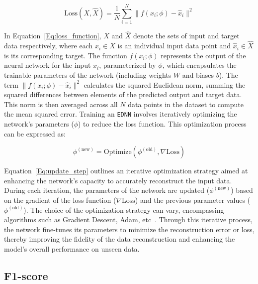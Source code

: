 \documentclass[letterpaper]{article}
\begin{document}
\begin{equation}
\label{Eq:loss_function}
\text{Loss}(X, \hat{X}) = \frac{1}{N} \sum_{i=1}^{N} \|f(x_i; \phi) - \hat{x}_i\|^2
\end{equation}



In Equation~\ref{Eq:loss_function}, $X$ and \(\hat{X}\) denote the sets of input and target data respectively, where each $x_i \in X$ is an individual input data point and $\hat{x}_i \in \hat{X}$ is its corresponding target. The function $f(x_i; \phi)$ represents the output of the neural network for the input \(x_i\), parameterized by $\phi$, which encapsulates the trainable parameters of the network (including weights $W$ and biases $b$). The term $\|f(x_i; \phi) - \hat{x}_i\|^2$ calculates the squared Euclidean norm, summing the squared differences between elements of the predicted output and target data. This norm is then averaged across all $N$ data points in the dataset to compute the mean squared error.
Training an \texttt{EDNN} involves iteratively optimizing the network's parameters ($\phi$) to reduce the loss function. This optimization process can be expressed as:

\begin{equation}
\label{Eq:update_step}
\phi^{(\text{new})} = \text{Optimize} \left( \phi^{(\text{old})}, \nabla \text{Loss} \right)
\end{equation}

Equation~\ref{Eq:update_step} outlines an iterative optimization strategy aimed at enhancing the network's capacity to accurately reconstruct the input data. During each iteration, the parameters of the network are updated ($\phi^{(\text{new})}$) based on the gradient of the loss function ($\nabla \text{Loss}$) and the previous parameter values ($\phi^{(\text{old})}$). The choice of the optimization strategy can vary, encompassing algorithms such as Gradient Descent, Adam, etc~\cite{goodfellow2016deep}. Through this iterative process, the network fine-tunes its parameters to minimize the reconstruction error or loss, thereby improving the fidelity of the data reconstruction and enhancing the model's overall performance on unseen data.

\subsection{F1-score}
\label{sec:F1}
\end{document}
